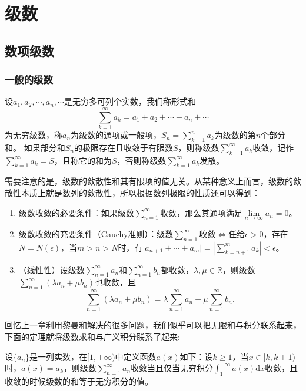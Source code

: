 \chapter{级数}
\section{数项级数}
    \subsection{一般的级数}
    \begin{definition}[级数]

        设\(a_1,a_2,\cdots,a_n,\cdots\)是无穷多可列个实数，我们称形式和\[\sum_{k=1}^{\infty}a_k=a_1+a_2+\cdots+a_n+\cdots\]为无穷级数，称\(a_n\)为级数的通项或一般项，\enspace\(S_n=\sum\limits_{k=1}^{n}a_k\)为级数的第\(n\)个部分和。
        如果部分和\(S_n\)的极限存在且收敛于有限数\(S\)，则称级数\(\sum\limits_{k=1}^{\infty}a_k\)收敛，记作\(\sum\limits_{k=1}^{\infty}a_k=S\)，且称它的和为\(S\)，否则称级数\(\sum\limits_{k=1}^{\infty}a_k\)发散。
    \end{definition}

    需要注意的是，级数的敛散性和其有限项的值无关。从某种意义上而言，级数的敛散性本质上就是数列的敛散性，所以根据数列极限的性质还可以得到：
    \begin{property}
        \begin{enumerate}
            \item 级数收敛的必要条件：如果级数\(\sum\limits_{n=1}^{\infty}\)收敛，那么其通项满足\(\lim\limits_{n\to\infty}a_n=0\)。
            \item 级数收敛的充要条件（Cauchy准则）：级数\(\sum\limits_{n=1}^{\infty}\)收敛\(\iff\)任给\(\epsilon>0\)，存在\(N=N(\epsilon)\)，当\(m>n>N\)时，有\(\vert a_{n+1}+\cdots+a_m\vert=\left|\sum\limits_{k=n+1}^{m}a_k\right|<\epsilon\)。
            \item （线性性）设级数\(\sum\limits_{n=1}^{\infty}a_n\)和\(\sum\limits_{n=1}^{\infty}b_n\)都收敛，\(\lambda,\mu\in\mathbb{R}\)，则级数\(\sum\limits_{n=1}^{\infty}(\lambda a_n+\mu b_n)\)也收敛，且\[\sum_{n=1}^{\infty}(\lambda a_n+\mu b_n)=\lambda\sum_{n=1}^{\infty}a_n+\mu\sum_{n=1}^{\infty}b_n.\]
        \end{enumerate}
    \end{property}

    回忆上一章利用黎曼和解决的很多问题，我们似乎可以把无限和与积分联系起来，下面的定理就将级数求和与广义积分联系了起来:
    \begin{lemma}
        设\(\{a_n\}\)是一列实数，在\([1,+\infty)\)中定义函数\(a(x)\)如下：设\(k\geq1\)，当\(x\in[k,k+1)\)时，\(a(x)=a_k\)，则级数\(\sum\limits_{n=1}^{\infty}a_n\)收敛当且仅当无穷积分\(\displaystyle\int_{1}^{+\infty}a(x)\mathrm{d}x\)收敛，且收敛的时候级数的和等于无穷积分的值。
    \end{lemma}\

